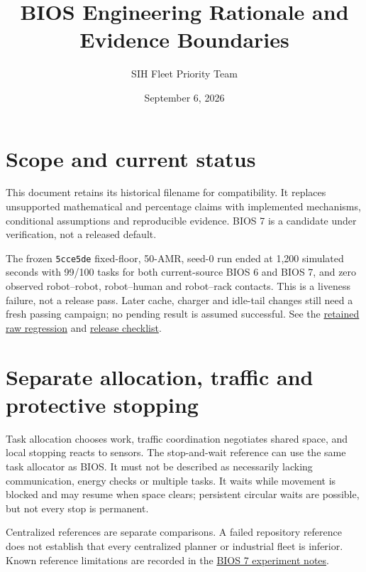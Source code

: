 \documentclass[12pt]{article}
\title{BIOS Engineering Rationale and Evidence Boundaries}
\author{SIH Fleet Priority Team}
\date{September 6, 2026}
\begin{document}
\maketitle

\section*{Scope and current status}
This document retains its historical filename for compatibility. It replaces
unsupported mathematical and percentage claims with implemented mechanisms,
conditional assumptions and reproducible evidence. BIOS 7 is a candidate under
verification, not a released default.

The frozen \texttt{5cce5de} fixed-floor, 50-AMR, seed-0 run ended at 1,200 simulated
seconds with 99/100 tasks for both current-source BIOS 6 and BIOS 7, and zero
observed robot--robot, robot--human and robot--rack contacts. This is a liveness
failure, not a release pass. Later cache, charger and idle-tail changes still need
a fresh passing campaign; no pending result is assumed successful. See the
\href{../artifacts/benchmarks/bios7-release-5cce5de-regression50.json}{retained raw regression}
and \href{24-BIOS7-RELEASE-CHECKLIST.md}{release checklist}.

\section{Separate allocation, traffic and protective stopping}
Task allocation chooses work, traffic coordination negotiates shared space, and
local stopping reacts to sensors. The stop-and-wait reference can use the same
task allocator as BIOS. It must not be described as necessarily lacking
communication, energy checks or multiple tasks. It waits while movement is blocked
and may resume when space clears; persistent circular waits are possible, but not
every stop is permanent.

Centralized references are separate comparisons. A failed repository reference
does not establish that every centralized planner or industrial fleet is inferior.
Known reference limitations are recorded in the
\href{23-BIOS7-EXPERIMENT.md}{BIOS 7 experiment notes}.
\end{document}
